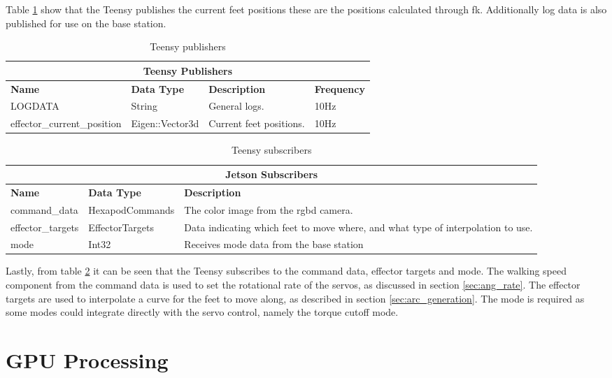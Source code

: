 Table \ref{tab:teensy_pubs} show that the Teensy publishes the current feet positions these are the positions calculated through \ac{fk}. Additionally
log data is also published for use on the base station.
\begin{table}[h]
    \begin{tabularx}{\textwidth}{| l | l | X | l |}
        \hline
        \multicolumn{4}{|c|}{\textbf{Teensy Publishers}} \\ \hline
        \textbf{Name} & \textbf{Data Type} & \textbf{Description} & \textbf{Frequency} \\ \hline
        LOGDATA & String & General logs. & 10Hz \\ \hline
        effector\_current\_position & Eigen::Vector3d & Current feet positions. & 10Hz \\ \hline
    \end{tabularx}
    \caption{Teensy publishers}
    \label{tab:teensy_pubs}
\end{table}
\begin{table}[h]
    \centering
    \begin{tabularx}{\textwidth}{| l | l | X |}
        \hline
        \multicolumn{3}{|c|}{\textbf{Jetson Subscribers}} \\ \hline
        \textbf{Name} & \textbf{Data Type} & \textbf{Description} \\ \hline
        command\_data & HexapodCommands & The color image from the \ac{rgbd} camera. \\ \hline
        effector\_targets & EffectorTargets & Data indicating which feet to move where, and what type of interpolation to use.\\ \hline
        mode & Int32 & Receives mode data from the base station \\ \hline
    \end{tabularx}
    \caption{Teensy subscribers}
    \label{tab:teensy_subs}
\end{table}

\noindent
Lastly, from table \ref{tab:teensy_subs} it can be seen that the Teensy subscribes to the command data, effector targets and mode.
The walking speed component from the command data is used to set the rotational rate of the servos, as discussed in section \ref{sec:ang_rate}.
The effector targets are used to interpolate a curve for the feet to move along, as described in section \ref{sec:arc_generation}. The mode is required
as some modes could integrate directly with the servo control, namely the torque cutoff mode.

\section{GPU Processing}

